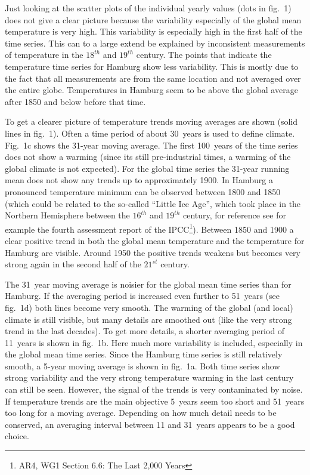 \documentclass[a4paper]{scrartcl}
\begin{document}
Just looking at the scatter plots of the individual yearly values (dots in fig.~1) does not give a clear picture because the variability especially of the global mean temperature is very high. 
This variability is especially high in the first half of the time series. 
This can to a large extend be explained by inconsistent measurements of temperature in the $18^{th}$ and $19^{th}$ century. 
The points that indicate the temperature time series for Hamburg show less variability. 
This is mostly due to the fact that all measurements are from the same location and not averaged over the entire globe. 
Temperatures in Hamburg seem to be above the global average after 1850 and below before that time. 

To get a clearer picture of temperature trends moving averages are shown (solid lines in fig.~1). 
Often a time period of about 30~years is used to define climate. 
Fig.~1c shows the 31-year moving average. 
The first 100~years of the time series does not show a warming (since its still pre-industrial times, a warming of the global climate is not expected). 
For the global time series the 31-year running mean does not show any trends up to approximately 1900. 
In Hamburg a pronounced temperature minimum can be observed between 1800 and 1850 (which could be related to the so-called ``Little Ice Age'', which took place in the Northern Hemisphere  between the $16^{th}$ and $19^{th}$ century, for reference see for example the fourth assessment report of the IPCC\footnote{AR4, WG1 Section 6.6: The Last 2,000 Years}). 
Between 1850 and 1900 a clear positive trend in both the global mean temperature and the temperature for Hamburg are visible. 
Around 1950 the positive trends weakens but becomes very strong again in the second half of the $21^{st}$ century. 

The 31~year moving average is noisier for the global mean time series than for Hamburg. 
If the averaging period is increased even further to 51~years (see fig.~1d) both lines become very smooth. 
The warming of the global (and local) climate is still visible, but many details are smoothed out (like the very strong trend in the last decades). 
To get more details, a shorter averaging period of 11~years is shown in fig.~1b. 
Here much more variability is included, especially in the global mean time series. 
Since the Hamburg time series is still relatively smooth, a 5-year moving average is shown in fig.~1a. 
Both time series show strong variability and the very strong temperature warming in the last century can still be seen. 
However, the signal of the trends is very contaminated by noise.
If temperature trends are the main objective 5~years seem too short and 51~years too long for a moving average. 
Depending on how much detail needs to be conserved, an averaging interval between 11 and 31~years appears to be a good choice. 
\end{document}
